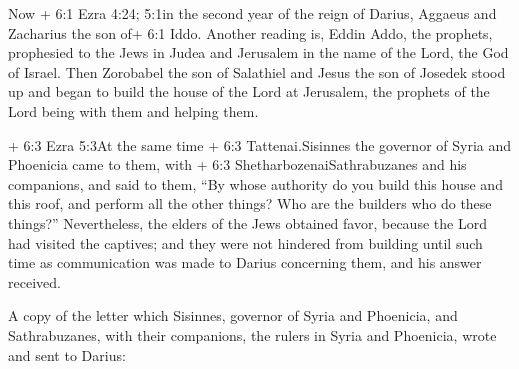  Now + 6:1 Ezra 4:24; 5:1in the second year of the reign of
Darius, Aggaeus and Zacharius the son of+ 6:1 Iddo. Another reading is,
Eddin Addo, the prophets, prophesied to the Jews in Judea and Jerusalem
in the name of the Lord, the God of Israel.  Then Zorobabel
the son of Salathiel and Jesus the son of Josedek stood up and began to
build the house of the Lord at Jerusalem, the prophets of the Lord being
with them and helping them.

 + 6:3 Ezra 5:3At the same time + 6:3 Tattenai.Sisinnes the
governor of Syria and Phoenicia came to them, with + 6:3
ShetharbozenaiSathrabuzanes and his companions, and said to them,
 ``By whose authority do you build this house and this roof,
and perform all the other things? Who are the builders who do these
things?''  Nevertheless, the elders of the Jews obtained
favor, because the Lord had visited the captives;  and they
were not hindered from building until such time as communication was
made to Darius concerning them, and his answer received.

 A copy of the letter which Sisinnes, governor of Syria and
Phoenicia, and Sathrabuzanes, with their companions, the rulers in Syria
and Phoenicia, wrote and sent to Darius:

